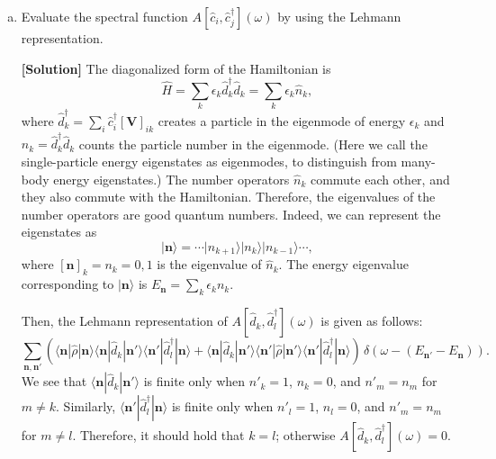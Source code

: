 \documentclass[11pt,a4paper,oneside]{article}
\begin{document}
\begin{enumerate}[(a)]

\item
Evaluate the spectral function $A[\hat{c}_i, \hat{c}_j^\dagger] (\omega)$ by using the Lehmann representation.

\textbf{[Solution]}
The diagonalized form of the Hamiltonian is 
\begin{equation}
\hat{H} = \sum_{k} \epsilon_k \hat{d}_k^\dagger \hat{d}_k = \sum_{k} \epsilon_k \hat{n}_{k},
\end{equation}
where $\hat{d}_k^\dagger = \sum_{i} \hat{c}_i^\dagger [\boldsymbol{V}]_{ik}$ creates a particle in the eigenmode of energy $\epsilon_k$ and $\hat{n}_{k} = \hat{d}_k^\dagger \hat{d}_k$ counts the particle number in the eigenmode.
(Here we call the single-particle energy eigenstates as eigenmodes, to distinguish from many-body energy eigenstates.)
The number operators $\hat{n}_{k}$ commute each other, and they also commute with the Hamiltonian.
Therefore, the eigenvalues of the number operators are good quantum numbers.
Indeed, we can represent the eigenstates as 
\begin{equation}
| \boldsymbol{n} \rangle = \cdots | n_{k+1} \rangle | n_{k} \rangle | n_{k-1} \rangle \cdots , 
\end{equation}
where $[\boldsymbol{n}]_k = n_k =  0,1$ is the eigenvalue of $\hat{n}_k$.
The energy eigenvalue corresponding to $|\boldsymbol{n} \rangle$ is $E_{\boldsymbol{n}} = \sum_k \epsilon_k n_k$.

Then, the Lehmann representation of $A[\hat{d}_k, \hat{d}_l^\dagger] (\omega)$ is given as follows:
\begin{equation}
\sum_{\boldsymbol{n}, \boldsymbol{n}'}
( \langle \boldsymbol{n} | \hat{\rho} | \boldsymbol{n} \rangle\!\langle\boldsymbol{n} | \hat{d}_k | \boldsymbol{n}' \rangle\!\langle \boldsymbol{n'} | \hat{d}_{l}^\dagger | \boldsymbol{n} \rangle
+
\langle \boldsymbol{n} | \hat{d}_k | \boldsymbol{n}' \rangle\!\langle \boldsymbol{n'} | \hat{\rho}  | \boldsymbol{n'} \rangle\!\langle \boldsymbol{n'} | \hat{d}_{l}^\dagger | \boldsymbol{n} \rangle )
\, \delta (\omega - (E_{\boldsymbol{n}'} - E_{\boldsymbol{n}})) .
\end{equation}
We see that $\langle\boldsymbol{n} | \hat{d}_k | \boldsymbol{n}' \rangle$ is finite only when $n'_k = 1$, $n_k = 0$, and $n'_m = n_m$ for $m \neq k$.
Similarly, $\langle \boldsymbol{n'} | \hat{d}_{l}^\dagger | \boldsymbol{n} \rangle$ is finite only when $n'_l = 1$, $n_l = 0$, and $n'_m = n_m$ for $m \neq l$.
Therefore, it should hold that $k = l$; otherwise $A[\hat{d}_k, \hat{d}_l^\dagger] (\omega) = 0$.


\end{enumerate}
\end{document}

